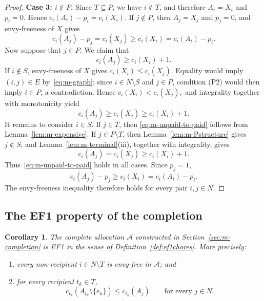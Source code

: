 \documentclass[sigconf,anonymous]{aamas}
\newcommand{\agents}{N}
\newcommand{\subsidy}{p}
\newcommand{\cost}{c}
\theoremstyle{acmplain}
\newtheorem{corollary}[theorem]{Corollary}
\theoremstyle{acmdefinition}
\theoremstyle{acmplain}
\begin{document}
\begin{proof}
\smallskip
\noindent\textbf{Case 3: $i\notin P$.}
Since $T\subseteq P$, we have $i\notin T$, and therefore $A_i=X_i$ and $\subsidy_i=0$. Hence \(\cost_i(A_i)-\subsidy_i=\cost_i(X_i). \) If $j\notin P$, then $A_j=X_j$ and $\subsidy_j=0$, and envy-freeness of $X$ gives
\[
    \cost_i(A_j)-\subsidy_j
    =\cost_i(X_j)
    \geq\cost_i(X_i)=\cost_i(A_i)-\subsidy_i.
\]
Now suppose that $j\in P$. We claim that
\begin{equation}
\label{eq:m-unpaid-to-paid}
    \cost_i(A_j)\geq \cost_i(X_i)+1.
\end{equation}
If $i\notin S$, envy-freeness of $X$ gives $\cost_i(X_i)\leq\cost_i(X_j)$. Equality would imply $(i,j)\in E$ by~\eqref{eq:m-graph}; since $i\in\agents\setminus S$ and $j\in P$, condition \textnormal{(P2)} would then imply $i\in P$, a contradiction. Hence \(\cost_i(X_i)<\cost_i(X_j), \) and integrality together with monotonicity yield
\[
\cost_i(A_j)\geq\cost_i(X_j)\geq\cost_i(X_i)+1.
\] It remains to consider $i\in S$. If $j\in T$, then \eqref{eq:m-unpaid-to-paid} follows from Lemma~\ref{lem:m-expensive}. If $j\in P\setminus T$, then Lemma~\ref{lem:m-Pstructure} gives $j\notin S$, and Lemma~\ref{lem:m-terminal}(iii), together with integrality, gives
\[
    \cost_i(A_j)=\cost_i(X_j)\geq\cost_i(X_i)+1.
\]
Thus~\eqref{eq:m-unpaid-to-paid} holds in all cases. Since $\subsidy_j=1$,
\[
    \cost_i(A_j)-\subsidy_j
    \geq\cost_i(X_i)
    =\cost_i(A_i)-\subsidy_i.
\]
The envy-freeness inequality therefore holds for every pair $i,j\in\agents$. \end{proof}

\subsection{The EF1 property of the completion}


\begin{corollary}
\label{cor:ef1}
The complete allocation $\mathcal{A}$ constructed in Section~\ref{sec:m-completion} is EF1 in the sense of Definition~\ref{def:ef1chores}. More precisely:
\begin{enumerate}
    \item [(i)] every non-recipient $i\in N\setminus T$ is envy-free in  $\mathcal{A}$; and
    \item [(ii)] for every recipient $t_k\in T$,
    \[ c_{t_k}(A_{t_k}\setminus\{e_k\}) \leq c_{t_k}(A_j) \qquad\text{for every }j\in N.
    \]
\end{enumerate}
\end{corollary}
\end{document}

